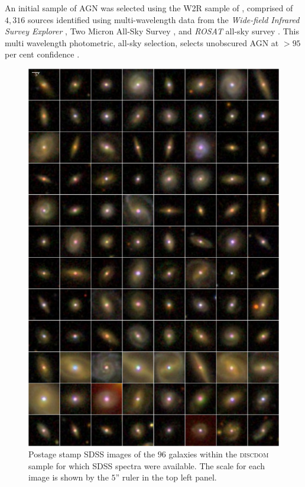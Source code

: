 An initial sample of AGN was selected using the W2R sample of \citet{edelson12}, comprised of $4,316$ sources identified using multi-wavelength data from the \emph{Wide-field Infrared Survey Explorer} \citep[\emph{WISE};][]{wright10}, Two Micron All-Sky Survey \citep[2MASS;][]{skrutskie06}, and \emph{ROSAT} all-sky survey \citep[RASS;][]{voges99}. This multi wavelength photometric, all-sky selection, selects unobscured AGN at $>95$ per cent confidence \citep{edelson12}.


\begin{figure}
\centering
\includegraphics[height=0.9\textheight]{agn/mosaic_all_diskdom.pdf}
\caption[SDSS images of DISKDOM sample]{Postage stamp SDSS images of the $96$ galaxies within the \textsc{discdom} sample for which SDSS spectra were available. The scale for each image is shown by the $5$'' ruler in the top left panel.}
\label{fig:exampleimages}
\end{figure}


